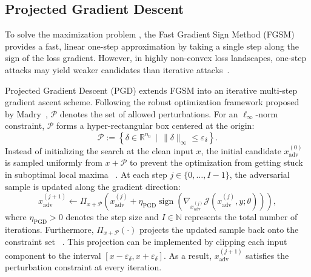 \subsection{Projected Gradient Descent}
\label{subsec:pgd}
To solve the maximization problem , the Fast Gradient Sign Method 
(FGSM)~\cite{goodfellowExplainingHarnessingAdversarial2015} provides a fast, linear one-step approximation by taking a 
single step along the sign of the loss gradient. However, in highly non-convex loss landscapes, 
one-step attacks may yield weaker candidates than iterative attacks~\cite{madryDeepLearningModels2019}.

Projected Gradient Descent (PGD) extends FGSM into an iterative multi-step gradient ascent scheme. 
Following the robust optimization framework proposed by Madry~\cite{madryDeepLearningModels2019}, 
$\mathcal{P}$ denotes the set of allowed perturbations. 
For an $\ell_\infty$-norm constraint, $\mathcal{P}$ forms a hyper-rectangular box centered at the origin:
\begin{equation}
    \label{eq:perturbation-set}
    \mathcal{P} := \left\{
        \delta \in \mathbb{R}^{n_0}
        \,\mid\,
        \|\delta\|_\infty \leq \varepsilon_\delta
    \right\}.
\end{equation}
Instead of initializing the search at the clean input $x$, the initial candidate $x_{\mathrm{adv}}^{(0)}$ is sampled uniformly 
from $x + \mathcal{P}$ to prevent the optimization from getting stuck in suboptimal local maxima~
\cite{madryDeepLearningModels2019}. At each step $j \in \{0, \dots, I-1\}$, the adversarial sample is updated along the gradient direction:
\begin{equation}
    \label{eq:adversarial-update}
    x_{\mathrm{adv}}^{(j+1)}\leftarrow 
        \Pi_{x + \mathcal{P}} \left(
            x_{\mathrm{adv}}^{(j)} + \eta_{\mathrm{PGD}} \operatorname{sign} \left(
                \nabla_{x_{\mathrm{adv}}^{(j)}} \mathcal{J} \left(
                    x_{\mathrm{adv}}^{(j)}, y; \theta
                \right)
            \right)
        \right),
\end{equation}
where $\eta_{\mathrm{PGD}} > 0$ denotes the step size and $I \in \mathbb{N}$ represents the total number of iterations. 
Furthermore, $\Pi_{x + \mathcal{P}}(\cdot)$ projects the updated sample back onto the constraint set~
\cite{madryDeepLearningModels2019}. This projection can be implemented by clipping 
each input component to the interval $[x-\varepsilon_\delta,x+\varepsilon_\delta]$. 
As a result, $x_{\mathrm{adv}}^{(j+1)}$ satisfies the perturbation constraint at every iteration.


